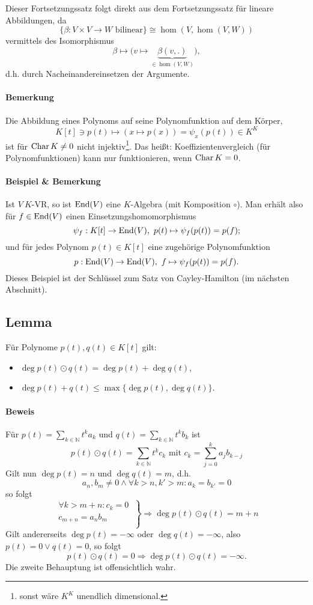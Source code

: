 	Dieser Fortsetzungssatz folgt direkt aus dem Fortsetzungssatz für lineare Abbildungen, da
		\[ \{\beta:V\times V\to W \text{ bilinear}\} \cong \hom(V,\hom(V,W))\]
	vermittels des Isomorphismus
		\[ \beta \mapsto \big(v\mapsto\underset{\in \hom(V,W)}{\underbrace{\beta(v,.)}}\big), \]
	d.h. durch Nacheinandereinsetzen der Argumente.
\paragraph{Bemerkung}
	Die Abbildung eines Polynoms auf seine Polynomfunktion auf dem Körper,
		\[ K[t]\ni p(t)\mapsto (x\mapsto p(x))=\psi_x(p(t))\in K^K \]
	ist für $ \operatorname{Char} K\neq 0 $ nicht injektiv\footnote{sonst wäre $K^K$ unendlich dimensional.}. Das heißt: Koeffizientenvergleich (für Polynomfunktionen) kann nur funktionieren, wenn $ \operatorname{Char} K = 0 $.
\paragraph{Beispiel \& Bemerkung}
	Ist $ V\ K $-VR, so ist $ \operatorname{End}(V) $ eine $ K $-Algebra (mit Komposition $ \circ $). Man erhält also für $ f\in \operatorname{End}(V) $ einen Einsetzungshomomorphismus
		\[ \psi_f: K[t]\to \operatorname{End}(V),\ p(t) \mapsto \psi_f(p(t)) = p(f); \]
	und für jedes Polynom $ p(t)\in K[t] $ eine zugehörige Polynomfunktion
		\[ p: \operatorname{End}(V)\to\operatorname{End}(V),\ f\mapsto \psi_f(p(t))= p(f). \]
	Dieses Beispiel ist der Schlüssel zum Satz von Cayley-Hamilton (im nächsten Abschnitt).
\subsection{Lemma}
	\begin{Lemma}
		Für Polynome $ p(t), q(t)\in K[t] $ gilt:
			\begin{itemize}
				\item $ \deg p(t)\odot q(t) = \deg p(t)+\deg q(t) $,
				\item $ \deg p(t)+q(t) \leq \max\{\deg p(t), \deg q(t)\} $.
			\end{itemize}
	\end{Lemma}
\paragraph{Beweis}
	Für $ p(t) = \sum_{k\in\mathbb{N}}t^ka_k $ und $ q(t) = \sum_{k\in\mathbb{N}}t^kb_k $ ist
		\[ p(t)\odot q(t) = \sum_{k\in\mathbb{N}}t^kc_k \text{ mit } c_k = \sum_{j=0}^{k}a_jb_{k-j} \]
	Gilt nun $ \deg p(t) = n $ und $ \deg q(t) = m $, d.h.
		\[ a_n,b_m \neq 0 \land \forall k>n, k'>m:a_k = b_{k'}=0 \] 
	so folgt
		\[ \left.
		\begin{aligned}
		\forall k>m+n : c_k = 0\ \\
		        c_{m+n} = a_nb_m\ \\
		\end{aligned}
		 \right\}
		\Rightarrow \deg p(t)\odot q(t) = m+n \]
	Gilt andererseits $ \deg p(t) = -\infty $ oder $ \deg q(t) = -\infty $, also $ p(t) = 0 \lor q(t) = 0 $,
	so folgt
		\[ p(t)\odot q(t) = 0 \Rightarrow \deg p(t)\odot q(t) = -\infty. \]
	Die zweite Behauptung ist offensichtlich wahr.

